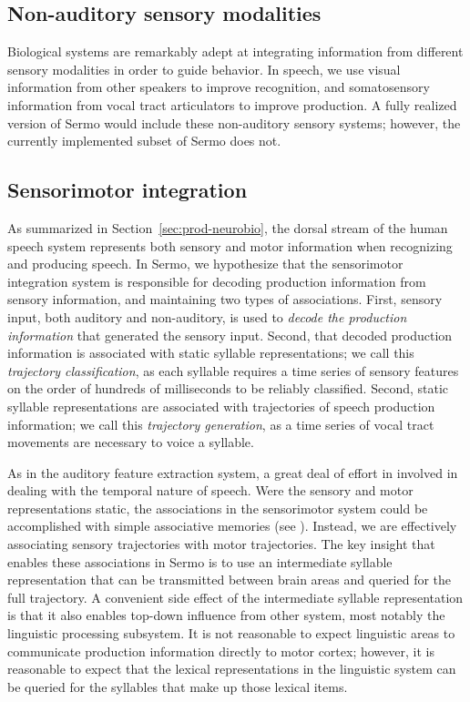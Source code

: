 \subsection{Non-auditory sensory modalities}

Biological systems are remarkably adept
at integrating information
from different sensory modalities
in order to guide behavior.
In speech,
we use visual information
from other speakers to improve recognition,
and somatosensory information
from vocal tract articulators
to improve production.
A fully realized version of Sermo
would include these non-auditory sensory systems;
however, the currently implemented
subset of Sermo does not.

\subsection{Sensorimotor integration}
\label{sec:model-sm}

As summarized in Section~\ref{sec:prod-neurobio},
the dorsal stream of the human speech system
represents both sensory and motor information
when recognizing and producing speech.
In Sermo,
we hypothesize that
the sensorimotor integration system
is responsible for decoding production information
from sensory information,
and maintaining two types of associations.
First, sensory input,
both auditory and non-auditory,
is used to \textit{decode the production information}
that generated the sensory input.
Second, that decoded production information
is associated with
static syllable representations;
we call this \textit{trajectory classification},
as each syllable requires
a time series of sensory features
on the order of hundreds of milliseconds
to be reliably classified.
Second, static syllable representations
are associated with
trajectories of speech production information;
we call this \textit{trajectory generation},
as a time series of vocal tract movements
are necessary to voice a syllable.

As in the auditory feature extraction system,
a great deal of effort in involved in
dealing with the temporal nature of speech.
Were the sensory and motor representations static,
the associations in the sensorimotor system
could be accomplished
with simple associative memories
(see \cite{eliasmith2012,eliasmith2013}).
Instead, we are effectively associating
sensory trajectories with motor trajectories.
The key insight
that enables these associations in Sermo
is to use an intermediate syllable representation
that can be transmitted between
brain areas and queried
for the full trajectory.
A convenient side effect of
the intermediate syllable representation
is that it also enables
top-down influence from
other system,
most notably the linguistic processing subsystem.
It is not reasonable to expect
linguistic areas to communicate
production information directly
to motor cortex;
however, it is reasonable to expect
that the lexical representations
in the linguistic system
can be queried for the syllables
that make up those lexical items.


